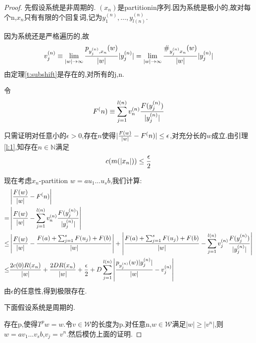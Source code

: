 \documentclass[a4paper,11pt,oneside]{book}
\begin{document}
\begin{proof}
先假设系统是非周期的.
$(x_n)$是partitionin序列.因为系统是极小的,故对每个n,$x_n$只有有限的个回复词,记为$y_1^{(n)},\ldots,y_{l(n)}^{(n)}$.

因为系统还是严格遍历的,故
$$v_j^{(n)}\equiv \lim_{|w|\to \infty}{p_{y_j^{(n)},x_n}(w)\over |w|}|y_j^{(n)}|=\lim_{|w|\to \infty}{\#_{y_j^{(n)}x_n}(w)\over |w|}|y_j^{(n)}|$$
由定理\ref{t:subshift}是存在的,对所有的j,n.

令$$F^(n)\equiv \sum_{j=1}^{l(n)}v_n^{(n)}{F(y_j^{(n)})\over |y_j^{(n)}|}$$

只需证明对任意小的$\epsilon>0$,存在$n$使得$|{F(w)\over |w|}-F^(n)|\leq \epsilon$,对充分长的$w$成立.由引理\ref{l:1},知存在$n\in\mathbb{N}$满足
$$c(m(|x_n|))\leq {\epsilon\over 2}$$

现在考虑$x_n$-partition $w=au_1\ldots u_sb$,我们计算:
\begin{align*}
&\left|{F(w)\over |w|}-F^(n)\right|\\
=&\left|{F(w)\over |w|}-\sum_{j=1}^{l(n)}v_n^{(n)}{F(y_j^{(n)})\over |y_j^{(n)}|}\right|\\
\leq & \left|{F(w)\over |w|}-{F(a)+\sum_{j=1}^sF(u_j)+F(b)\over |w|}\right|+\left|{F(a)+\sum_{j=1}^sF(u_j)+F(b)\over |w|}-\sum_{j=1}^{l(n)}v_j^{(n)}{F(y_j^{(n)})\over |y_j^{(n)}|}\right| \\
\leq &{2c(0)R(x_n)\over |w|}+{2DR(x_n)\over |w|}+{\epsilon\over 2}+D\sum_{j=1}^{l(n)}\left|{p_{y_j^{(n)}}(w)|y_j^{(n)}|\over |w|}-v_j^{(n)}\right|
\end{align*}
由$\epsilon$的任意性,得到极限存在.

下面假设系统是周期的.

存在p,使得$T^pw=w$.令$v\in \mathcal{W}$的长度为p.对任意n,$w\in\mathcal{W}$满足$|w|\geq |v^n|$,则$w=av_1\ldots v_sb$,$v_j=v^n$.然后模仿上面的证明.
\end{proof}
\end{document}
